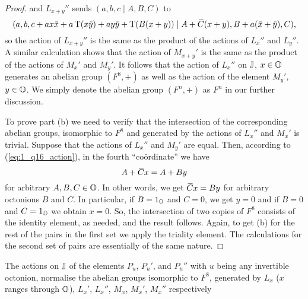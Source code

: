 \begin{proof}
    and $L_{x+y}''$ sends $(a,b,c\mid A,B,C)$ to
    \begin{equation*}
        (a,b,c+ax\ovx  + a\Tr(x\ovy ) + ay\ovy  + \Tr(B(x+y)) \mid
        A + \ovC (x+y), B+a(\ovx  + \ovy ), C),
    \end{equation*}
    so the action of $L_{x+y}''$ is the same as the product of the actions of $L_x''$ and
    $L_y''$. A similar calculation shows that the action of $M_{x+y}'$ is the same
    as the product of the actions of $M_x'$ and $M_y'$. It follows that the action of 
    $L_x''$ on $\mathbb{J}$, $x\in \mathbb{O}$ generates an abelian group $(F^8,+)$ as well as the action
    of the element $M_y'$, $y \in \mathbb{O}$. We simply denote the abelian group $(F^n,+)$ as $F^n$ in
    our further discussion. 
    
    To prove part (b) we need to verify that the intersection of the corresponding abelian groups, isomorphic to $F^8$ and generated by the actions of $L_x''$ and $M_x'$ is trivial. Suppose that the
    actions of $L_x''$ and $M_y'$ are equal. Then, according to (\ref{eq:1_q16_action}), 
    in the fourth ``co{\"o}rdinate'' we have
    \begin{equation*}
    	 A+\mathord{\mbox{\hspace*{0pt}}\,\overline{\!C\!\!\;}\!\:}\mbox{\hspace*{0pt}} x = A + B y
    \end{equation*}
    for arbitrary $A,B,C \in \mathbb{O}$. In other words, we get $\mathord{\mbox{\hspace*{0pt}}\,\overline{\!C\!\!\;}\!\:}\mbox{\hspace*{0pt}} x = B y$ for arbitrary octonions
    $B$ and $C$. In particular, if $B = 1_{\mathbb{O}}$ and $C = 0$, we get $y = 0$ and if
    $B = 0$ and $C = 1_{\mathbb{O}}$ we obtain $x = 0$. So, the intersection of two copies of
    $F^8$ consists of the identity element, as needed, and the result follows. 
    Again, to get (b) for the rest of the pairs in the first set we apply the 
    triality element. The calculations for the second set of pairs are essentially
    of the same nature. 
\end{proof}

\begin{lemma}
	\label{lemma:1_pu_normalise_f8}
	The actions on $\mathbb{J}$ of the elements $P_u$, $P_u'$, and $P_u''$ with $u$ being any invertible octonion, 
	normalise the abelian groups isomorphic to $F^8$, 
	generated by $L_x$ ($x$ ranges through $\mathbb{O}$), 
	$L_x'$, $L_x''$, $M_x$, $M_x'$, $M_x''$ respectively
\end{lemma}

